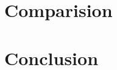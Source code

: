 \documentclass[bibtotocnumbered, headsepline,normalheadings]{report}
\begin{document}
\chapter{Comparision}
\label{chap:comparision}


\chapter{Conclusion}
\label{chap:conclusion}



\nocite{*}


\listoffigures
\begingroup \let\clearpage\relax
\listoftables \endgroup

\end{document}
